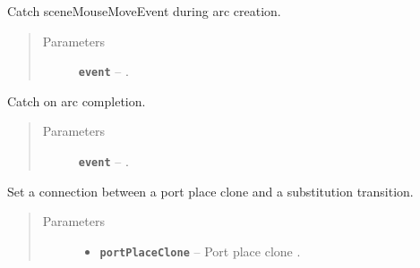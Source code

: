 \documentclass[a4paper,10pt,english]{sphinxmanual}
\begin{document}
\begin{fulllineitems}
\begin{fulllineitems}
\begin{quote}
\begin{description}
\end{description}\end{quote}

\end{fulllineitems}


\begin{fulllineitems}
\label{gui_link:gui.DiagramEditor.DiagramEditor.sceneMouseMoveEvent}
Catch sceneMouseMoveEvent during arc creation.
\begin{quote}\begin{description}
\item[{Parameters}] \leavevmode
\textbf{\texttt{event}} -- .

\end{description}\end{quote}

\end{fulllineitems}


\begin{fulllineitems}
\label{gui_link:gui.DiagramEditor.DiagramEditor.sceneMouseReleaseEvent}
Catch  on arc completion.
\begin{quote}\begin{description}
\item[{Parameters}] \leavevmode
\textbf{\texttt{event}} -- .

\end{description}\end{quote}

\end{fulllineitems}


\begin{fulllineitems}
\label{gui_link:gui.DiagramEditor.DiagramEditor.setPortConnection}
Set a connection between a port place clone and a substitution transition.
\begin{quote}\begin{description}
\item[{Parameters}] \leavevmode\begin{itemize}
\item {} 
\textbf{\texttt{portPlaceClone}} -- Port place clone .


\end{itemize}
\end{description}
\end{quote}
\end{fulllineitems}
\end{fulllineitems}
\end{document}
